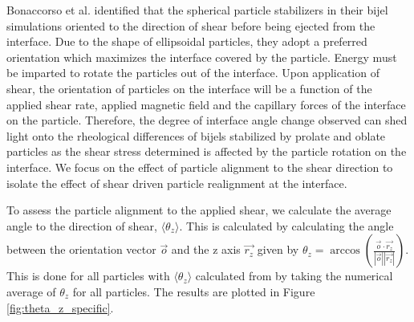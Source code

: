 Bonaccorso et al. identified that the spherical particle stabilizers in their bijel simulations oriented to the direction of shear before being
ejected from the interface. \cite{bonaccorso_shear_2020} Due to the shape of ellipsoidal particles, they adopt a preferred orientation which
maximizes the interface covered by the particle. \cite{davies_dipolar_2015, davies_interface_2014} Energy must be imparted to rotate the particles
out of the interface. Upon application of shear, the orientation of particles on the interface will be a function of the applied shear rate, 
applied magnetic field and the capillary forces of the interface on the particle. \cite{cao_modeling_2021, chhabra_drag_1999, brenner_stokes_1963, naga_capillary_2021}
Therefore, the degree of interface angle change observed can shed light onto the rheological 
differences of bijels stabilized by prolate and oblate particles as the shear stress determined is affected by the particle rotation on the interface. We focus on
the effect of particle alignment to the shear direction to isolate the effect of shear driven particle realignment at the interface. 

To assess the particle alignment to the applied shear, we calculate the average angle to the direction of shear, $\langle \theta_z \rangle$. This is calculated
by calculating the angle between the orientation vector $\vec{o}$ and the z axis $\vec{r_z}$ given by 
$\theta_z = \arccos(\frac{ \vec{o} \cdot \vec{r_z} }{ |\vec{o}| |\vec{r_z}| })$. This is done for all particles with $\langle \theta_z \rangle$ calculated from
by taking the numerical average of $\theta_z$ for all particles. The results are plotted in Figure \ref{fig:theta_z_specific}.

